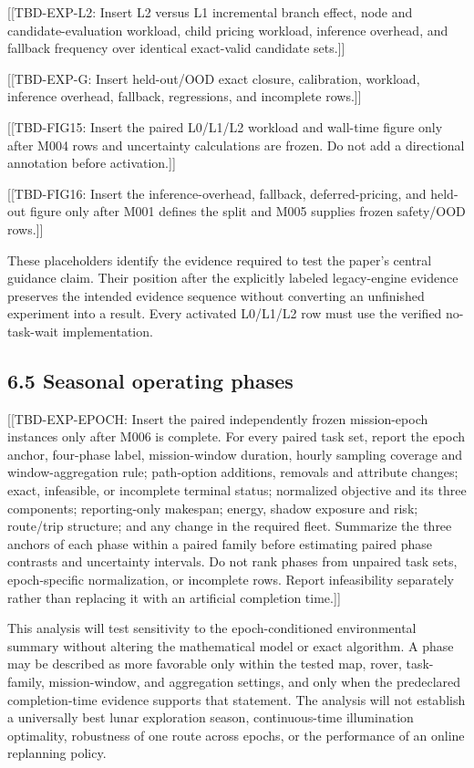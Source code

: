 \documentclass[
  11pt,
]{article}
\begin{document}
{[}{[}TBD-EXP-L2: Insert L2 versus L1 incremental branch effect, node
and candidate-evaluation workload, child pricing workload, inference
overhead, and fallback frequency over identical exact-valid candidate
sets.{]}{]}

{[}{[}TBD-EXP-G: Insert held-out/OOD exact closure, calibration,
workload, inference overhead, fallback, regressions, and incomplete
rows.{]}{]}

{[}{[}TBD-FIG15: Insert the paired L0/L1/L2 workload and wall-time
figure only after M004 rows and uncertainty calculations are frozen. Do
not add a directional annotation before activation.{]}{]}

{[}{[}TBD-FIG16: Insert the inference-overhead, fallback,
deferred-pricing, and held-out figure only after M001 defines the split
and M005 supplies frozen safety/OOD rows.{]}{]}

These placeholders identify the evidence required to test the paper's
central guidance claim. Their position after the explicitly labeled
legacy-engine evidence preserves the intended evidence sequence without
converting an unfinished experiment into a result. Every activated
L0/L1/L2 row must use the verified no-task-wait implementation.

\hypertarget{seasonal-operating-phases}{%
\subsection{6.5 Seasonal operating
phases}\label{seasonal-operating-phases}}

{[}{[}TBD-EXP-EPOCH: Insert the paired independently frozen
mission-epoch instances only after M006 is complete. For every paired
task set, report the epoch anchor, four-phase label, mission-window
duration, hourly sampling coverage and window-aggregation rule;
path-option additions, removals and attribute changes; exact,
infeasible, or incomplete terminal status; normalized objective and its
three components; reporting-only makespan; energy, shadow exposure and
risk; route/trip structure; and any change in the required fleet.
Summarize the three anchors of each phase within a paired family before
estimating paired phase contrasts and uncertainty intervals. Do not rank
phases from unpaired task sets, epoch-specific normalization, or
incomplete rows. Report infeasibility separately rather than replacing
it with an artificial completion time.{]}{]}

This analysis will test sensitivity to the epoch-conditioned
environmental summary without altering the mathematical model or exact
algorithm. A phase may be described as more favorable only within the
tested map, rover, task-family, mission-window, and aggregation
settings, and only when the predeclared completion-time evidence
supports that statement. The analysis will not establish a universally
best lunar exploration season, continuous-time illumination optimality,
robustness of one route across epochs, or the performance of an online
replanning policy.
\end{document}
